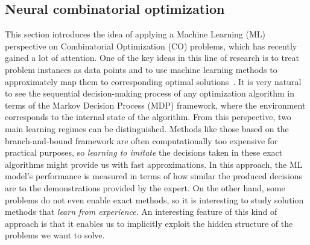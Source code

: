 \documentclass{article}
\theoremstyle{definition}
\theoremstyle{plain}
\begin{document}

\subsection{Neural combinatorial optimization}


This section introduces the idea of applying a Machine Learning (ML) perspective
on Combinatorial Optimization (CO) problems, which has recently gained a lot of
attention. One of the key ideas in this line of research is to treat problem
instances as data points and to use machine learning methods to approximately
map them to corresponding optimal solutions~\cite{bengioMachineLearningCombinatorial2020}.
It is very natural to see the sequential decision-making process of any
optimization algorithm in terms of the Markov Decision Process (MDP) framework,
where the environment corresponds to the internal state of the algorithm. From
this perspective, two main learning regimes can be distinguished.
Methods like those based on the branch-and-bound framework are
often computationally too expensive for practical purposes, so \textit{learning
  to imitate} the decisions taken in these exact algorithms might provide us
with fast approximations. In this approach, the ML model's performance is
measured in terms of how similar the produced decisions are to the
demonstrations provided by the expert.
On the other hand, some problems do not even enable exact methods, so it is
interesting to study solution methods that \textit{learn from experience}. An
interesting feature of this kind of approach is that it enables us to implicitly
exploit the hidden structure of the problems we want to solve.
\end{document}
